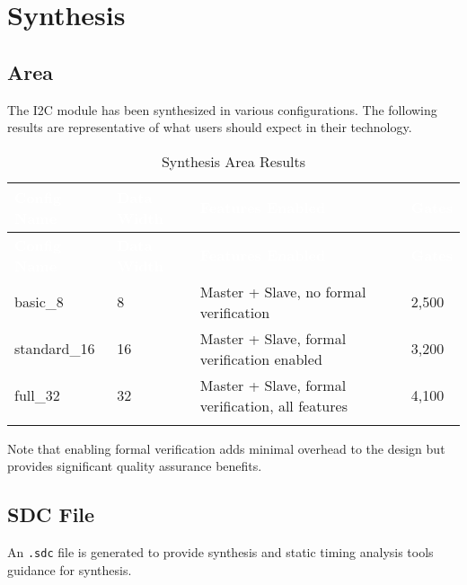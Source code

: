 \section{Synthesis}

\subsection{Area}
The I2C module has been synthesized in various configurations. The following results are representative of what users should expect in their technology.

\renewcommand*{\arraystretch}{1.4}
\begingroup
\small
\begin{longtable}[H]{
    | p{}
    | p{}
    | p{}
    | p{} |
  }
  \hline
  \rowcolor{black}
  \textcolor{white}{\textbf{Config Name}} &
  \textcolor{white}{\textbf{Data Width}} &
  \textcolor{white}{\textbf{Features Enabled}} &
  \textcolor{white}{\textbf{Gates}} \\ 
  \hline \hline
  \endfirsthead

  \rowcolor{black}
  \textcolor{white}{\textbf{Config Name}} &
  \textcolor{white}{\textbf{Data Width}} &
  \textcolor{white}{\textbf{Features Enabled}} &
  \textcolor{white}{\textbf{Gates}} \\ 
  \hline \hline
  \endhead

  \hline
  \endfoot

basic\_8 &
8 &
Master + Slave, no formal verification &
2,500 \\ \hline

standard\_16 &
16 &
Master + Slave, formal verification enabled &
3,200 \\ \hline

full\_32 &
32 &
Master + Slave, formal verification, all features &
4,100 \\ \hline

\caption{Synthesis Area Results}
\label{table:area}
\end{longtable}
\endgroup

Note that enabling formal verification adds minimal overhead to the design but provides significant quality assurance benefits.

\subsection{SDC File}
An \texttt{.sdc} file is generated to provide synthesis and static timing analysis tools guidance for synthesis.

